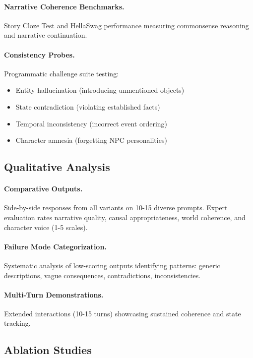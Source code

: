 \documentclass[11pt]{article}
\begin{document}
\paragraph{Narrative Coherence Benchmarks.} Story Cloze Test and HellaSwag \cite{zellers2019hellaswag} performance measuring commonsense reasoning and narrative continuation.

\paragraph{Consistency Probes.} Programmatic challenge suite testing:
\begin{itemize}
    \item Entity hallucination (introducing unmentioned objects)
    \item State contradiction (violating established facts)
    \item Temporal inconsistency (incorrect event ordering)
    \item Character amnesia (forgetting NPC personalities)
\end{itemize}

\subsection{Qualitative Analysis}

\paragraph{Comparative Outputs.} Side-by-side responses from all variants on 10-15 diverse prompts. Expert evaluation rates narrative quality, causal appropriateness, world coherence, and character voice (1-5 scales).

\paragraph{Failure Mode Categorization.} Systematic analysis of low-scoring outputs identifying patterns: generic descriptions, vague consequences, contradictions, inconsistencies.

\paragraph{Multi-Turn Demonstrations.} Extended interactions (10-15 turns) showcasing sustained coherence and state tracking.

\subsection{Ablation Studies}
\end{document}

